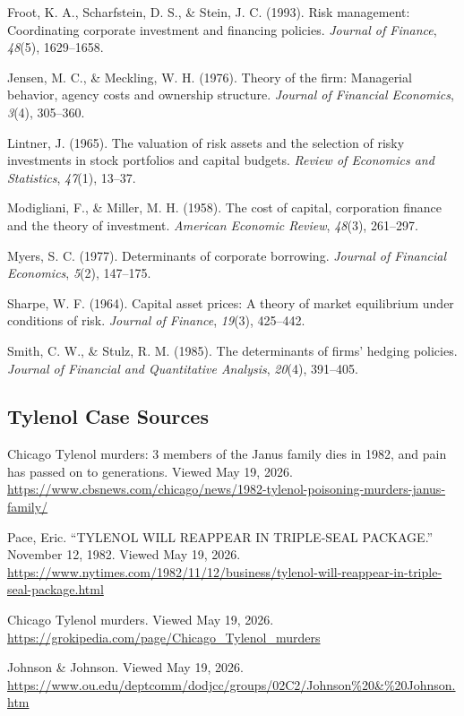 \documentclass[11pt,openany]{book}
\begin{document}
Froot, K. A., Scharfstein, D. S., \& Stein, J. C. (1993). Risk management: Coordinating corporate investment and financing policies. \emph{Journal of Finance}, \emph{48}(5), 1629--1658.

Jensen, M. C., \& Meckling, W. H. (1976). Theory of the firm: Managerial behavior, agency costs and ownership structure. \emph{Journal of Financial Economics}, \emph{3}(4), 305--360.

Lintner, J. (1965). The valuation of risk assets and the selection of risky investments in stock portfolios and capital budgets. \emph{Review of Economics and Statistics}, \emph{47}(1), 13--37.

Modigliani, F., \& Miller, M. H. (1958). The cost of capital, corporation finance and the theory of investment. \emph{American Economic Review}, \emph{48}(3), 261--297.

Myers, S. C. (1977). Determinants of corporate borrowing. \emph{Journal of Financial Economics}, \emph{5}(2), 147--175.

Sharpe, W. F. (1964). Capital asset prices: A theory of market equilibrium under conditions of risk. \emph{Journal of Finance}, \emph{19}(3), 425--442.

Smith, C. W., \& Stulz, R. M. (1985). The determinants of firms' hedging policies. \emph{Journal of Financial and Quantitative Analysis}, \emph{20}(4), 391--405.

\subsection*{Tylenol Case Sources}

Chicago Tylenol murders: 3 members of the Janus family dies in 1982, and pain has passed on to generations. Viewed May 19, 2026. \url{https://www.cbsnews.com/chicago/news/1982-tylenol-poisoning-murders-janus-family/}

Pace, Eric. ``TYLENOL WILL REAPPEAR IN TRIPLE-SEAL PACKAGE.'' November 12, 1982. Viewed May 19, 2026. \url{https://www.nytimes.com/1982/11/12/business/tylenol-will-reappear-in-triple-seal-package.html}

Chicago Tylenol murders. Viewed May 19, 2026. \url{https://grokipedia.com/page/Chicago_Tylenol_murders}

Johnson \& Johnson. Viewed May 19, 2026. \url{https://www.ou.edu/deptcomm/dodjcc/groups/02C2/Johnson\%20\&\%20Johnson.htm}

\endgroup
\end{document}
